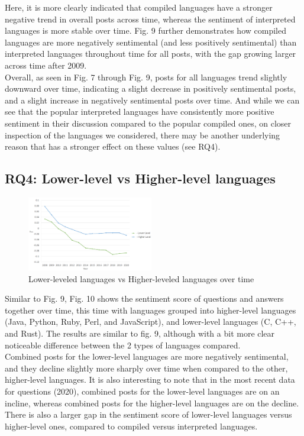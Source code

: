 \documentclass[conference]{IEEEtran}
\begin{document}
Here, it is more clearly indicated that compiled languages have a stronger negative trend in overall posts across time, whereas the sentiment of interpreted languages is more stable over time. Fig. 9 further demonstrates how compiled languages are more negatively sentimental (and less positively sentimental) than interpreted languages throughout time for all posts, with the gap growing larger across time after 2009. \\

Overall, as seen in Fig. 7 through Fig. 9, posts for all languages trend slightly downward over time, indicating a slight decrease in positively sentimental posts, and a slight increase in negatively sentimental posts over time. And while we can see that the popular interpreted languages have consistently more positive sentiment in their discussion compared to the popular compiled ones, on closer inspection of the languages we considered, there may be another underlying reason that has a stronger effect on these values (see RQ4). \\

\subsection{RQ4: Lower-level vs Higher-level languages}
\begin{figure}[htbp]
\centerline{\includegraphics[width=0.49\textwidth]{figures/time_lower_higher.png}}
\caption{Lower-leveled languages vs Higher-leveled languages over time}
\label{fig}
\end{figure}

Similar to Fig. 9, Fig. 10 shows the sentiment score of questions and answers together over time, this time with languages grouped into higher-level languages (Java, Python, Ruby, Perl, and JavaScript), and lower-level languages (C, C++, and Rust). The results are similar to fig. 9, although with a bit more clear noticeable difference between the 2 types of languages compared.\\

Combined posts for the lower-level languages are more negatively sentimental, and they decline slightly more sharply over time when compared to the other, higher-level languages. It is also interesting to note that in the most recent data for questions (2020), combined posts for the lower-level languages are on an incline, whereas combined posts for the higher-level languages are on the decline. There is also a larger gap in the sentiment score of lower-level languages versus higher-level ones, compared to compiled versus interpreted languages.\\
\end{document}
